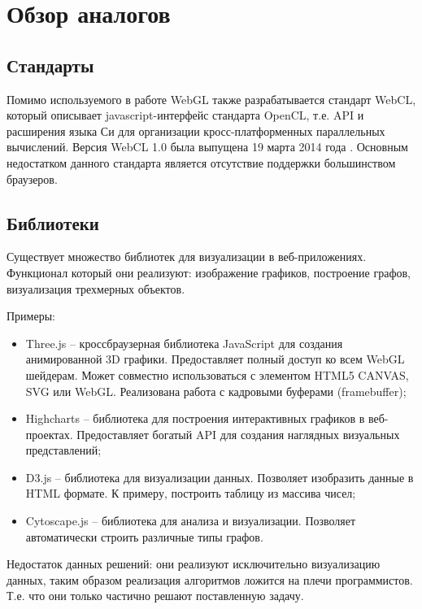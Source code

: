 \newpage
\section{Обзор аналогов}

\subsection{Стандарты}

Помимо используемого в работе WebGL также разрабатывается стандарт WebCL, который описывает 
javascript-интерфейс стандарта OpenCL, т.е. API и расширения языка Си для организации
кросс-платформенных параллельных вычислений. Версия WebCL 1.0 была выпущена 19 марта 2014 года \cite{webcl10}.
Основным недостатком данного стандарта является отсутствие поддержки большинством браузеров.

\subsection{Библиотеки}
Существует множество библиотек для визуализации в веб-приложениях. Функционал который они реализуют:
изображение графиков, построение графов, визуализация трехмерных объектов.

Примеры:
\begin{itemize}
  \item Three.js -- кроссбраузерная библиотека JavaScript для создания анимированной 3D графики.
    Предоставляет полный доступ ко всем WebGL шейдерам. Может совместно использоваться с элементом
    HTML5 CANVAS, SVG или WebGL. Реализована работа с кадровыми буферами (framebuffer);

  \item Highcharts -- библиотека для построения интерактивных графиков в веб-проектах. Предоставляет
    богатый API для создания наглядных визуальных представлений;

  \item D3.js -- библиотека для визуализации данных. Позволяет изобразить данные в HTML формате. 
    К примеру, построить таблицу из массива чисел;
    
  \item Cytoscape.js -- библиотека для анализа и визуализации. Позволяет автоматически 
    строить различные типы графов.
\end{itemize}

Недостаток данных решений: они реализуют исключительно визуализацию данных, таким образом реализация
алгоритмов ложится на плечи программистов. Т.е. что они только частично решают поставленную
задачу.
